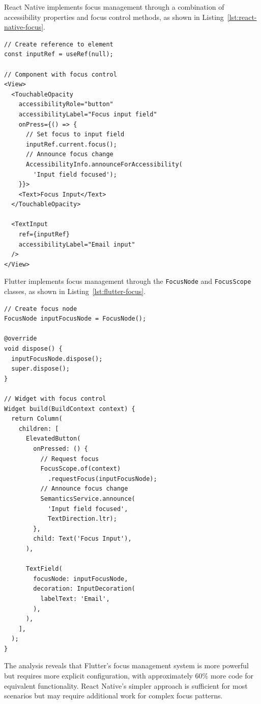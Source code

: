{React Native implements focus management through a combination of accessibility properties and focus control methods, as shown in Listing~\ref{lst:react-native-focus}.

\begin{lstlisting}[style=ReactNativeStyle, caption=Focus management in React Native, label=lst:react-native-focus]
// Create reference to element
const inputRef = useRef(null);

// Component with focus control
<View>
  <TouchableOpacity
    accessibilityRole="button"
    accessibilityLabel="Focus input field"
    onPress={() => {
      // Set focus to input field
      inputRef.current.focus();
      // Announce focus change
      AccessibilityInfo.announceForAccessibility(
        'Input field focused');
    }}>
    <Text>Focus Input</Text>
  </TouchableOpacity>
  
  <TextInput
    ref={inputRef}
    accessibilityLabel="Email input"
  />
</View>
\end{lstlisting}

Flutter implements focus management through the \texttt{FocusNode} and \texttt{FocusScope} classes, as shown in Listing~\ref{lst:flutter-focus}.

\begin{lstlisting}[style=DartStyle, caption=Focus management in Flutter, label=lst:flutter-focus]
// Create focus node
FocusNode inputFocusNode = FocusNode();

@override
void dispose() {
  inputFocusNode.dispose();
  super.dispose();
}

// Widget with focus control
Widget build(BuildContext context) {
  return Column(
    children: [
      ElevatedButton(
        onPressed: () {
          // Request focus
          FocusScope.of(context)
            .requestFocus(inputFocusNode);
          // Announce focus change
          SemanticsService.announce(
            'Input field focused',
            TextDirection.ltr);
        },
        child: Text('Focus Input'),
      ),
      
      TextField(
        focusNode: inputFocusNode,
        decoration: InputDecoration(
          labelText: 'Email',
        ),
      ),
    ],
  );
}
\end{lstlisting}

\pagebreak

The analysis reveals that Flutter's focus management system is more powerful but requires more explicit configuration, with approximately 60\% more code for equivalent functionality. React Native's simpler approach is sufficient for most scenarios but may require additional work for complex focus patterns.

}
